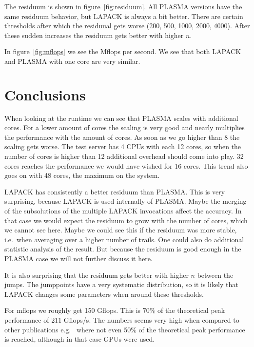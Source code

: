\documentclass[a4paper,final,ngerman,english]{article}
\begin{document}
The residuum is shown in figure~\ref{fig:residuum}.
All PLASMA versions have the same residuum behavior, but LAPACK is always a bit better.  
There are certain thresholds after which the residuual gets worse (200, 500, 1000, 2000, 4000).
After these sudden increases the residuum gets better with higher $n$.

In figure~\ref{fig:mflops} we see the Mflops per second.
We see that both LAPACK and PLASMA with one core are very similar. 

\section{Conclusions}
When looking at the runtime we can see that PLASMA scales with additional cores. 
For a lower amount of cores the scaling is very good and nearly multiplies the performance with the amount of cores.
As soon as we go higher than 8 the scaling gets worse.
The test server has 4 CPUs with each 12 cores, so when the number of cores is higher than 12 additional
overhead should come into play.
32 cores reaches the performance we would have wished for 16 cores.
This trend also goes on with 48 cores, the maximum on the system. 

LAPACK has consistently a better residuum than PLASMA.\@
This is very surprising, because LAPACK is used internally of PLASMA.\@
Maybe the merging of the subsolutions of the multiple LAPACK invocations affect the accuracy.
In that case we would expect the residuum to grow with the number of cores, which we cannot see here.
Maybe we could see this if the residuum was more stable, i.e.\ when averaging over a higher number of trails.
One could also do additional statistic analysis of the result.
But because the residuum is good enough in the PLASMA case we will not further discuss it here.

It is also surprising that the residuum gets better with higher $n$ between the jumps.
The jumppoints have a very systematic distribution, so it is likely that
LAPACK changes some parameters when around these thresholds.

For mflops we roughly get 150 Gflops.
This is \~70\% of the theoretical peak performance of 211 Gflops/s.
The numbers seems very high when compared to other publications e.g.~\cite{lawn266}
where not even 50\% of the theoretical peak performance is reached, although in that case
GPUs were used. 

%  
\begin{footnotesize}
\end{footnotesize}
\end{document}
